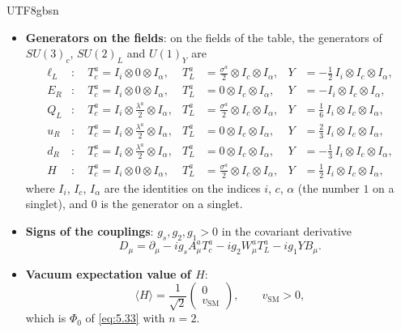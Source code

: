 \documentclass[11pt,a4paper,oneside]{report}
\begin{document}
\begin{CJK*}{UTF8}{gbsn}
\begin{itemize}
\item \textbf{\boldmath Generators on the fields}: on the fields of the table, the generators of $SU(3)_c$, $SU(2)_L$ and $U(1)_Y$ are
\begin{equation*}
\begin{aligned}
\ell_L&:\quad T_c^a=I_i\otimes0\otimes I_\alpha, &
T_L^a&=\frac{\sigma^a}{2}\otimes I_c\otimes I_\alpha, &
Y&=-\frac12\,I_i\otimes I_c\otimes I_\alpha,\\
E_R&:\quad T_c^a=I_i\otimes0\otimes I_\alpha, &
T_L^a&=0\otimes I_c\otimes I_\alpha, &
Y&=-I_i\otimes I_c\otimes I_\alpha,\\
Q_L&:\quad T_c^a=I_i\otimes\frac{\lambda^a}{2}\otimes I_\alpha, &
T_L^a&=\frac{\sigma^a}{2}\otimes I_c\otimes I_\alpha, &
Y&=\frac16\,I_i\otimes I_c\otimes I_\alpha,\\
u_R&:\quad T_c^a=I_i\otimes\frac{\lambda^a}{2}\otimes I_\alpha, &
T_L^a&=0\otimes I_c\otimes I_\alpha, &
Y&=\frac23\,I_i\otimes I_c\otimes I_\alpha,\\
d_R&:\quad T_c^a=I_i\otimes\frac{\lambda^a}{2}\otimes I_\alpha, &
T_L^a&=0\otimes I_c\otimes I_\alpha, &
Y&=-\frac13\,I_i\otimes I_c\otimes I_\alpha,\\
H&:\quad T_c^a=I_i\otimes0\otimes I_\alpha, &
T_L^a&=\frac{\sigma^a}{2}\otimes I_c\otimes I_\alpha, &
Y&=\frac12\,I_i\otimes I_c\otimes I_\alpha,
\end{aligned}
\tag{5.47}\label{eq:5.47}
\end{equation*}
where $I_i$, $I_c$, $I_\alpha$ are the identities on the indices $i$, $c$, $\alpha$ (the number $1$ on a singlet), and $0$ is the generator on a singlet.

\item \textbf{\boldmath Signs of the couplings}: $g_s,g_2,g_1>0$ in the covariant derivative
\begin{equation*}
D_\mu=\partial_\mu-ig_sA_\mu^aT_c^a-ig_2W_\mu^aT_L^a-ig_1YB_\mu .
\tag{5.48}\label{eq:5.48}
\end{equation*}

\item \textbf{\boldmath Vacuum expectation value of $H$}:
\begin{equation*}
\langle H\rangle=\frac1{\sqrt2}\begin{pmatrix}0\\v_{\mathrm{SM}}\end{pmatrix},\qquad v_{\mathrm{SM}}>0,
\tag{5.49}\label{eq:5.49}
\end{equation*}
which is $\Phi_0$ of \eqref{eq:5.33} with $n=2$.
\end{itemize}



\end{CJK*}
\end{document}
